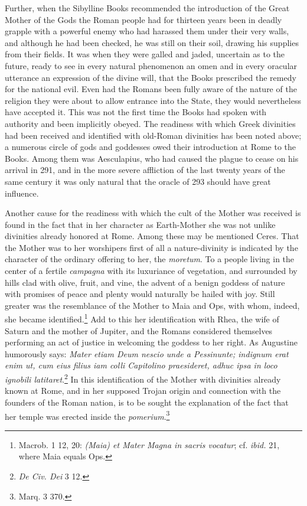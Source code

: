 \documentclass[a4paper, 11pt, oneside, polutonikogreek, french]{article}
\begin{document}
Further, when the Sibylline Books recommended the introduction of the Great Mother of the Gods the Roman people had for thirteen years been in deadly grapple with a powerful enemy who had harassed them under their very walls, and although he had been checked, he was still on their soil, drawing his supplies from their fields. It was when they were galled and jaded, uncertain as to the future, ready to see in every natural phenomenon an omen and in every oracular utterance an expression of the divine will, that the Books prescribed the remedy for the national evil. Even had the Romans been fully aware of the nature of the religion they were about to allow entrance into the State, they would nevertheless have accepted it. This was not the first time the Books had spoken with authority and been implicitly obeyed. The readiness with which Greek divinities had been received and identified with old-Roman divinities has been noted above; a numerous circle of gods and goddesses owed their introduction at Rome to the Books. Among them was Aesculapius, who had caused the plague to cease on his arrival in 291, and in the more severe affliction of the last twenty years of the same century it was only natural that the oracle of 293 should have great influence.

Another cause for the readiness with which the cult of the Mother was received is found in the fact that in her character as Earth-Mother she was not unlike divinities already honored at Rome. Among these may be mentioned Ceres. That the Mother was to her worshipers first of all a nature-divinity is indicated by the character of the ordinary offering to her, the \emph{moretum}. To a people living in the center of a fertile \emph{campagna} with its luxuriance of vegetation, and surrounded by hills clad with olive, fruit, and vine, the advent of a benign goddess of nature with promises of peace and plenty would naturally be hailed with joy. Still greater was the resemblance of the Mother to Maia and Ops, with whom, indeed, she became identified.\footnote{Macrob. 1 12, 20: \emph{(Maia) et Mater Magna in sacris vocatur}; cf. \emph{ibid.} 21, where Maia equals Ops.} Add to this her identification with Rhea, the wife of Saturn and the mother of Jupiter, and the Romans considered themselves performing an act of justice in welcoming the goddess to her right. As Augustine humorously says: \emph{Mater etiam Deum nescio unde a Pessinunte; indignum erat enim ut, cum eius filius iam colli Capitolino praesideret, adhuc ipsa in loco ignobili latitaret}.\footnote{\emph{De Civ. Dei} 3 12.} In this identification of the Mother with divinities already known at Rome, and in her supposed Trojan origin and connection with the founders of the Roman nation, is to be sought the explanation of the fact that her temple was erected inside the \emph{pomerium}.\footnote{Marq. 3 370.}
\end{document}
